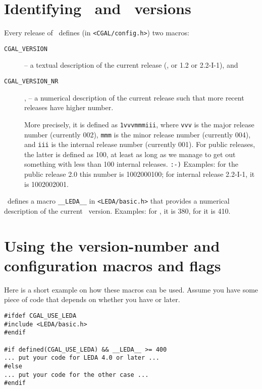 \section{Identifying \cgal\ and \leda\ versions}
\label{sec:which_versions}

Every release of \cgal\ defines (in \texttt{<CGAL/config.h>}) two
macros:
\begin{description}
\item[\texttt{CGAL\_VERSION}]
     -- a textual description of the
     current release (\eg, or 1.2 or 2.2-I-1), and 
\item[\texttt{CGAL\_VERSION\_NR}], 
     --  a numerical description of
     the current release such that more recent releases have higher
     number.

     More precisely, it is defined as \texttt{1vvvmmmiii},
     where \texttt{vvv} is the major release number (currently 002),
     \texttt{mmm} is the minor release number (currently 004), and
     \texttt{iii} is the internal release number (currently 001). For
     public releases, the latter is defined as 100, at least as long as we
     manage to get out something with less than 100 internal releases.
     \texttt{:-)} Examples: for the public release 2.0 this number is 
     1002000100; for internal release 2.2-I-1, it is 1002002001.
\end{description}
 
\noindent \leda\ defines a macro \texttt{\_\_LEDA\_\_}
in
\texttt{<LEDA/basic.h>} that provides a numerical description of the
current \leda\ version. Examples: for , it is 380, for
 it is 410.

\section{Using the version-number and configuration macros and flags}
\label{sec:using_version_macros}

Here is a short example on how these macros can be used. Assume you have some
piece of code that depends on whether you have  or later.
\begin{verbatim}
#ifdef CGAL_USE_LEDA
#include <LEDA/basic.h>
#endif

#if defined(CGAL_USE_LEDA) && __LEDA__ >= 400
... put your code for LEDA 4.0 or later ...
#else
... put your code for the other case ...
#endif 
\end{verbatim}

